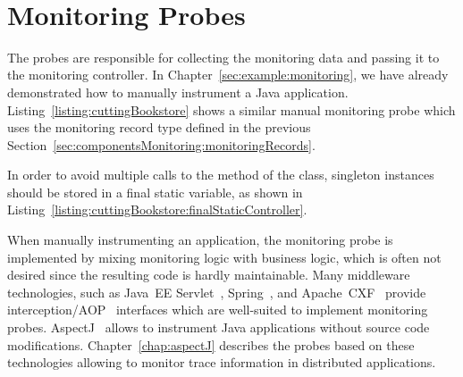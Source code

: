 
\ %

\setJavaCodeListing



\section{Monitoring Probes}\label{sec:monitoring:probe}

The probes are responsible for collecting the monitoring data and passing it %
to the monitoring controller. %
In Chapter~\ref{sec:example:monitoring}, we have already demonstrated how to %
manually instrument a Java application. Listing~\ref{listing:cuttingBookstore} %
shows a similar manual monitoring probe which uses the monitoring record type %
 defined in the previous Section~\ref{sec:componentsMonitoring:monitoringRecords}.

\pagebreak


\noindent In order to avoid multiple calls to the  method of the %
 class, singleton instances should be stored %
in a final static variable, as shown in Listing~\ref{listing:cuttingBookstore:finalStaticController}.



\noindent When manually instrumenting an application, the monitoring probe is implemented %
by mixing monitoring logic with business logic, which is often not desired since %
the resulting code is hardly maintainable. %
Many middleware technologies, such as Java~EE Servlet~\cite{JavaServletTechnology-WebSite}, %
Spring~\cite{Spring-WebSite}, and %
Apache~CXF~\cite{CXF-WebSite} provide interception/AOP~\cite{Kiczales1997} interfaces %
which are well-suited to implement monitoring probes. AspectJ~\cite{AspectJ-WebSite} allows to %
instrument Java applications without source code modifications. %
Chapter~\ref{chap:aspectJ} describes the \Kieker{} probes based on these technologies allowing to %
monitor trace information in distributed applications.

